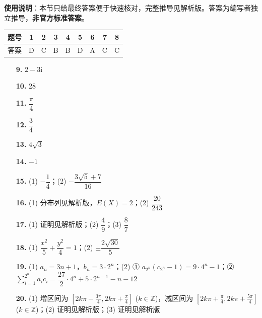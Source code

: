 
\begin{gknotice}
\textbf{使用说明}：本节只给最终答案便于快速核对，完整推导见解析版。答案为编写者独立推导，\textbf{非官方标准答案}。
\end{gknotice}

\begin{center}\begin{tabular}{ccccccccc}
\toprule
题号 & 1 & 2 & 3 & 4 & 5 & 6 & 7 & 8 \\
\midrule
答案 & D & C & B & B & D & A & C & C \\
\bottomrule
\end{tabular}\end{center}

\begin{itemize}[leftmargin=2.6em]
  \item[\textbf{9.}] $2 - 3\mathrm{i}$
  \item[\textbf{10.}] $28$
  \item[\textbf{11.}] $\dfrac{\pi}{4}$
  \item[\textbf{12.}] $\dfrac{3}{4}$
  \item[\textbf{13.}] $4\sqrt{3}$
  \item[\textbf{14.}] $-1$
\end{itemize}

\begin{itemize}[leftmargin=2.6em]
  \item[\textbf{15.}] (1) $-\dfrac{1}{4}$；(2) $-\dfrac{3\sqrt{5} + 7}{16}$
  \item[\textbf{16.}] (1) 分布列见解析版，$E(X) = 2$；(2) $\dfrac{20}{243}$
  \item[\textbf{17.}] (1) 证明见解析版；(2) $\dfrac{4}{9}$；(3) $\dfrac{8}{7}$
  \item[\textbf{18.}] (1) $\dfrac{x^2}{5} + \dfrac{y^2}{4} = 1$；(2) $\pm\dfrac{2\sqrt{30}}{5}$
  \item[\textbf{19.}] (1) $a_n = 3n + 1$，$b_n = 3 \cdot 2^n$；(2) ① $a_{2^n}(c_{2^n} - 1) = 9 \cdot 4^n - 1$；② $\sum_{i=1}^{2^n} a_i c_i = \dfrac{27}{2} \cdot 4^n + 5 \cdot 2^{n-1} - n - 12$
  \item[\textbf{20.}] (1) 增区间为 $[2k\pi - \frac{3\pi}{4}, 2k\pi + \frac{\pi}{4}]$ ($k \in \mathbb{Z}$)，减区间为 $[2k\pi + \frac{\pi}{4}, 2k\pi + \frac{5\pi}{4}]$ ($k \in \mathbb{Z}$)；(2) 证明见解析版；(3) 证明见解析版
\end{itemize}
